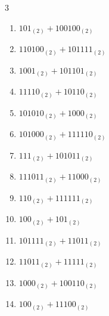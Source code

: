 \begin{multicols}{3}
\begin{enumerate}
  \item $101_{(2)} + 100100_{(2)}$


  \item $110100_{(2)} + 101111_{(2)}$


  \item $1001_{(2)} + 101101_{(2)}$


  \item $11110_{(2)} + 10110_{(2)}$


  \item $101010_{(2)} + 1000_{(2)}$


  \item $101000_{(2)} + 111110_{(2)}$


  \item $111_{(2)} + 101011_{(2)}$


\columnbreak %

  \item $111011_{(2)} + 11000_{(2)}$


  \item $110_{(2)} + 111111_{(2)}$


  \item $100_{(2)} + 101_{(2)}$


  \item $101111_{(2)} + 11011_{(2)}$


  \item $11011_{(2)} + 11111_{(2)}$


  \item $1000_{(2)} + 100110_{(2)}$


  \item $100_{(2)} + 11100_{(2)}$


\end{enumerate}
\end{multicols}
